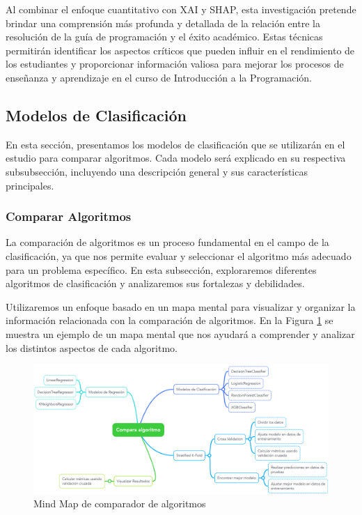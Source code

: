 Al combinar el enfoque cuantitativo con XAI y SHAP, esta investigación pretende brindar una comprensión más profunda y detallada de la relación entre la resolución de la guía de programación y el éxito académico. Estas técnicas permitirán identificar los aspectos críticos que pueden influir en el rendimiento de los estudiantes y proporcionar información valiosa para mejorar los procesos de enseñanza y aprendizaje en el curso de Introducción a la Programación.

\subsection{Modelos de Clasificación}

En esta sección, presentamos los modelos de clasificación que se utilizarán en el estudio para comparar algoritmos. Cada modelo será explicado en su respectiva subsubsección, incluyendo una descripción general y sus características principales.

\subsubsection{Comparar Algoritmos}

La comparación de algoritmos es un proceso fundamental en el campo de la clasificación, ya que nos permite evaluar y seleccionar el algoritmo más adecuado para un problema específico. En esta subsección, exploraremos diferentes algoritmos de clasificación y analizaremos sus fortalezas y debilidades.

Utilizaremos un enfoque basado en un mapa mental para visualizar y organizar la información relacionada con la comparación de algoritmos. En la Figura \ref{fig:mindMap_comparaAlgoritmos} se muestra un ejemplo de un mapa mental que nos ayudará a comprender y analizar los distintos aspectos de cada algoritmo.


\begin{figure}[H]
  \centering
  \includegraphics[width=1\textwidth]{img/compara_algoritmos/comparaAlgoritmoCompletoMindMap.png}
  \caption{Mind Map de comparador de algoritmos}
  \label{fig:mindMap_comparaAlgoritmos}
\end{figure}

